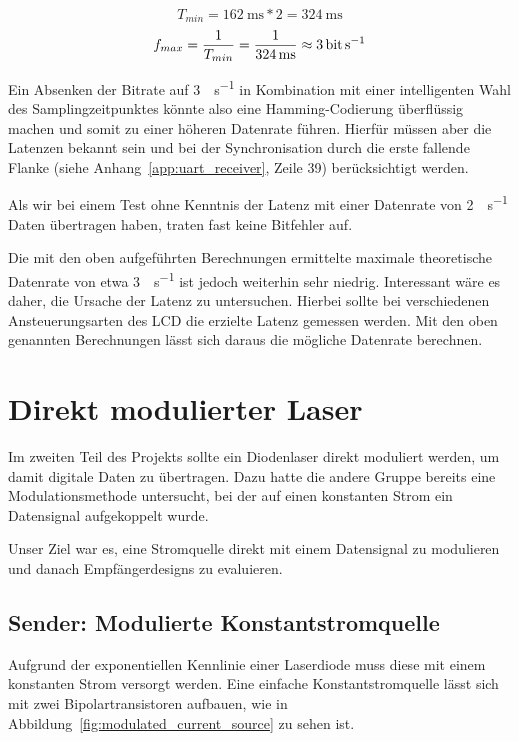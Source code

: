 \documentclass[12pt,a4paper]{article}
\begin{document}
\begin{equation}
	T_{min} = \SI{162}{\milli\second} * 2 = \SI{324}{\milli\second}
\end{equation}
\begin{equation}
	f_{max} = \frac{1}{T_{min}} = \frac{1}{\SI{324}{\milli\second}} \approx \SI{3}{\bit\per\second}
\end{equation}

Ein Absenken der Bitrate auf \SI{3}{\bit\per\second} in Kombination mit einer intelligenten Wahl des Samplingzeitpunktes könnte also eine Hamming-Codierung überflüssig machen und somit zu einer höheren Datenrate führen. Hierfür müssen aber die Latenzen bekannt sein und bei der Synchronisation durch die erste fallende Flanke (siehe Anhang~\ref{app:uart_receiver}, Zeile 39) berücksichtigt werden.

Als wir bei einem Test ohne Kenntnis der Latenz mit einer Datenrate von \SI{2}{\bit\per\second} Daten übertragen haben, traten fast keine Bitfehler auf.

Die mit den oben aufgeführten Berechnungen ermittelte maximale theoretische Datenrate von etwa \SI{3}{\bit\per\second} ist jedoch weiterhin sehr niedrig. Interessant wäre es daher, die Ursache der Latenz zu untersuchen. Hierbei sollte bei verschiedenen Ansteuerungsarten des LCD die erzielte Latenz gemessen werden. Mit den oben genannten Berechnungen lässt sich daraus die mögliche Datenrate berechnen.

\section{Direkt modulierter Laser}
Im zweiten Teil des Projekts sollte ein Diodenlaser direkt moduliert werden, um damit digitale Daten zu übertragen. Dazu hatte die andere Gruppe bereits eine Modulationsmethode untersucht, bei der auf einen konstanten Strom ein Datensignal aufgekoppelt wurde.

Unser Ziel war es, eine Stromquelle direkt mit einem Datensignal zu modulieren und danach Empfängerdesigns zu evaluieren.


\subsection{Sender: Modulierte Konstantstromquelle}
\label{sec:direct_tx}

Aufgrund der exponentiellen Kennlinie einer Laserdiode muss diese mit einem konstanten Strom versorgt werden. Eine einfache Konstantstromquelle lässt sich mit zwei Bipolartransistoren aufbauen, wie in Abbildung~\ref{fig:modulated_current_source} zu sehen ist.
\end{document}
